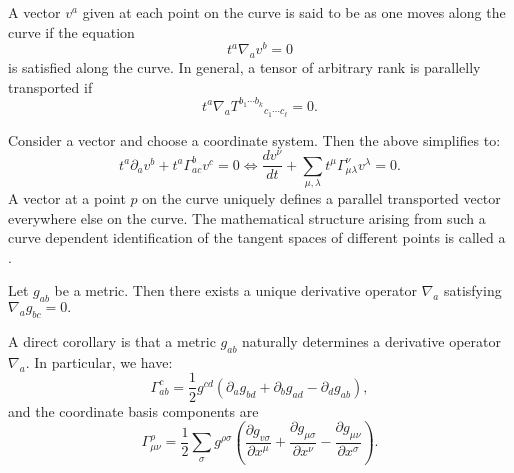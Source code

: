 \documentclass{article}
\numberwithin{equation}{section}
\begin{document}
    \begin{definition}
        A vector $v^a$ given at each point on the curve is said to be  as one moves along the curve if the equation
        \begin{equation*}
            t^a\nabla_av^b = 0
        \end{equation*}
        is satisfied along the curve. In general, a tensor of arbitrary rank is parallelly transported if 
        \begin{equation*}
            t^a\nabla_a T^{b_1\cdots b_k}{}_{c_1\cdots c_\ell} = 0.
        \end{equation*}
    \end{definition}
    Consider a vector and choose a coordinate system. Then the above simplifies to:
    \begin{equation*}
        t^a\partial_a v^b + t^a\Gamma^b_{ac}v^c = 0 \iff \frac{dv^\nu}{dt} + \sum_{\mu,\lambda} t^{\mu}\Gamma^{\nu}_{\mu\lambda}v^{\lambda} = 0.
    \end{equation*}
    A vector at a point $p$ on the curve uniquely defines a parallel transported vector everywhere else on the curve. The mathematical structure arising from such a curve dependent identification of the tangent spaces of different points is called a .
    \begin{theorem}
        Let $g_{ab}$ be a metric. Then there exists a unique derivative operator $\nabla_a$ satisfying $\nabla_ag_{bc}=0.$
    \end{theorem}
    A direct corollary is that a metric $g_{ab}$ naturally determines a derivative operator $\nabla_a$. In particular, we have:
    \begin{equation*}
        \Gamma^c_{ab} = \frac{1}{2}g^{cd}\left(\partial_ag_{bd} + \partial_bg_{ad} - \partial_dg_{ab}\right),
    \end{equation*}
    and the coordinate basis components are
    \begin{equation*}
        \Gamma^{\rho}_{\mu\nu} = \frac{1}{2}\sum_\sigma g^{\rho\sigma}\left(\frac{\partial g_{v\sigma}}{\partial x^\mu} + \frac{\partial g_{\mu\sigma}}{\partial x^\nu} - \frac{\partial g_{\mu\nu}}{\partial x^\sigma}\right).
    \end{equation*}
\end{document}
